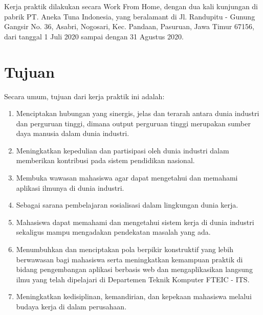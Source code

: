 Kerja praktik dilakukan secara Work From Home, dengan dua kali kunjungan di pabrik PT. Aneka Tuna Indonesia, yang beralamant di Jl. Randupitu - Gunung Gangsir No. 36, Asabri, Nogosari, Kec. Pandaan, Pasuruan, Jawa Timur 67156, dari tanggal 1 Juli 2020 sampai dengan 31 Agustus 2020.
\vspace{0.5ex}

\section{Tujuan}
\vspace{1ex}

Secara umum, tujuan dari kerja praktik ini adalah:
\vspace{0.5ex}

\begin{enumerate}[nolistsep]

  \item Menciptakan hubungan yang sinergis, jelas dan terarah antara dunia industri dan perguruan tinggi, dimana output perguruan tinggi merupakan sumber daya manusia dalam dunia industri.
  \vspace{0.5ex}

  \item Meningkatkan kepedulian dan partisipasi oleh dunia industri dalam memberikan kontribusi pada sistem pendidikan nasional.
  \vspace{0.5ex}

  \item Membuka wawasan mahasiswa agar dapat mengetahui dan memahami aplikasi ilmunya di dunia industri.
  \vspace{0.5ex}

  \item Sebagai sarana pembelajaran sosialisasi dalam lingkungan dunia kerja.
  \vspace{0.5ex}

  \item Mahasiswa dapat memahami dan mengetahui sistem kerja di dunia industri sekaligus mampu mengadakan pendekatan masalah yang ada.
  \vspace{0.5ex}

  \item Menumbuhkan dan menciptakan pola berpikir konstruktif yang lebih berwawasan bagi mahasiswa serta meningkatkan kemampuan praktik di bidang pengembangan aplikasi berbasis web dan mengaplikasikan langsung ilmu yang telah dipelajari di Departemen Teknik Komputer FTEIC - ITS.
  \vspace{0.5ex}

  \item Meningkatkan kedisiplinan, kemandirian, dan kepekaan mahasiswa melalui budaya kerja di dalam perusahaan.
  \vspace{0.5ex}

\end{enumerate}
\vspace{0.5ex}

